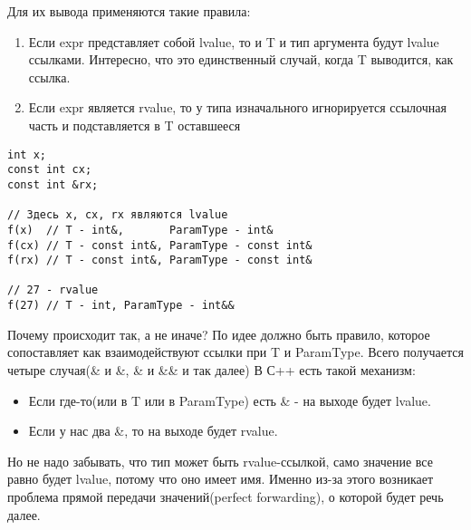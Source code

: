 			Для их вывода применяются такие правила:
			\begin{enumerate}
				\item Если expr представляет собой lvalue, то и T и тип аргумента будут lvalue ссылками. Интересно, что это единственный случай, когда T выводится, как ссылка.
				\item Если expr является rvalue, то у типа изначального игнорируется ссылочная часть и подставляется в T оставшееся
			\end{enumerate}
\begin{verbatim}
int x;
const int cx;
const int &rx;

// Здесь x, cx, rx являются lvalue
f(x)  // T - int&,       ParamType - int&
f(cx) // T - const int&, ParamType - const int&
f(rx) // T - const int&, ParamType - const int&

// 27 - rvalue
f(27) // T - int, ParamType - int&&
\end{verbatim}
			
			Почему происходит так, а не иначе?
			По идее должно быть правило, которое сопоставляет как взаимодействуют ссылки при T и ParamType. Всего получается четыре случая(\& и \&, \& и \&\& и так далее) В С++ есть такой механизм:
			\begin{itemize}
				\item Если где-то(или в T или в ParamType) есть \& - на выходе будет lvalue. 
				\item Если у нас два \&, то на выходе будет rvalue. 
			\end{itemize}
			Но не надо забывать, что тип может быть rvalue-ссылкой, само значение все равно будет lvalue, потому что оно имеет имя. Именно из-за этого возникает проблема прямой передачи значений(perfect forwarding), о которой будет речь далее.
			
